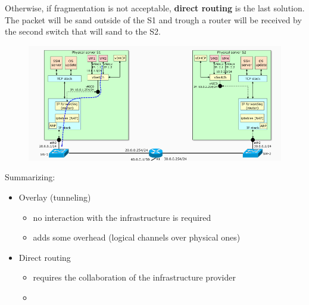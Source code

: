         \FloatBarrier
        Otherwise, if fragmentation is not acceptable, \textbf{direct routing} is the last solution. The packet will be sand outside of the S1 and trough a router will be received by the second switch that will sand to the S2.
        \begin{figure}[h!]
            \centering
            \includegraphics[scale=0.5]{images/direct routing.png}
        \end{figure}
        \FloatBarrier
        
        Summarizing:
        \begin{itemize}
            \item Overlay (tunneling)
            \begin{itemize}
                \item no interaction with the infrastructure is required
                \item adds some overhead (logical channels over physical ones)
            \end{itemize}
            \item Direct routing
            \begin{itemize}
                \item requires the collaboration of the infrastructure provider
                \item 
            \end{itemize}
        \end{itemize}